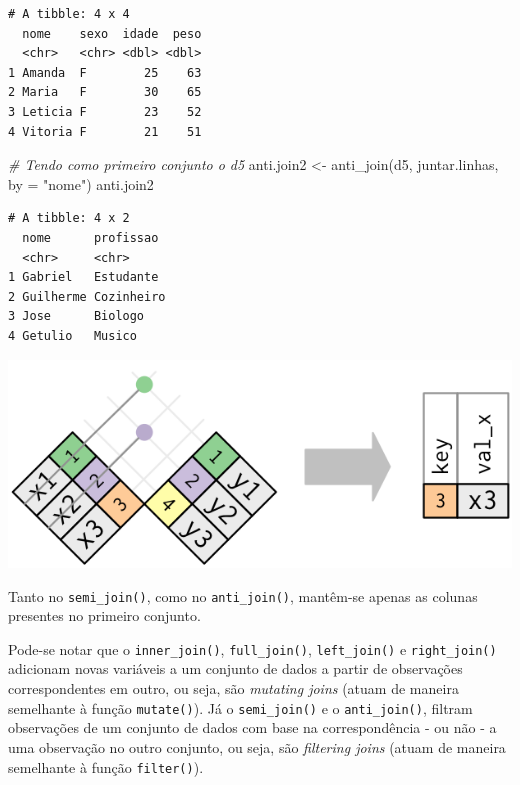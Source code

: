 \documentclass[
  brazilian,
]{book}
\newenvironment{Shaded}{\begin{snugshade}}{\end{snugshade}}
\newcommand{\AttributeTok}[1]{\textcolor[rgb]{0.77,0.63,0.00}{#1}}
\newcommand{\CommentTok}[1]{\textcolor[rgb]{0.56,0.35,0.01}{\textit{#1}}}
\newcommand{\FunctionTok}[1]{\textcolor[rgb]{0.00,0.00,0.00}{#1}}
\newcommand{\NormalTok}[1]{#1}
\newcommand{\OtherTok}[1]{\textcolor[rgb]{0.56,0.35,0.01}{#1}}
\newcommand{\StringTok}[1]{\textcolor[rgb]{0.31,0.60,0.02}{#1}}
\let\origfigure\figure
\let\endorigfigure\endfigure
\renewenvironment{figure}[1][2] {
    \expandafter\origfigure\expandafter[H]
} {
    \endorigfigure
}
\begin{document}
\begin{verbatim}
# A tibble: 4 x 4
  nome    sexo  idade  peso
  <chr>   <chr> <dbl> <dbl>
1 Amanda  F        25    63
2 Maria   F        30    65
3 Leticia F        23    52
4 Vitoria F        21    51
\end{verbatim}

\begin{Shaded}
\begin{Highlighting}[]
\CommentTok{\# Tendo como primeiro conjunto o \textasciigrave{}d5\textasciigrave{}}
\NormalTok{anti.join2 }\OtherTok{\textless{}{-}} \FunctionTok{anti\_join}\NormalTok{(d5, juntar.linhas, }\AttributeTok{by =} \StringTok{"nome"}\NormalTok{)}
\NormalTok{anti.join2}
\end{Highlighting}
\end{Shaded}

\begin{verbatim}
# A tibble: 4 x 2
  nome      profissao 
  <chr>     <chr>     
1 Gabriel   Estudante 
2 Guilherme Cozinheiro
3 Jose      Biologo   
4 Getulio   Musico    
\end{verbatim}

\begin{figure}

{\centering \includegraphics[width=0.5\linewidth]{imagens/join-anti} 

}

\caption{Esquematização da função $anti_join$. Fonte: R for Data Science, 2017.}\label{fig:unnamed-chunk-181}
\end{figure}

Tanto no \texttt{semi\_join()}, como no \texttt{anti\_join()}, mantêm-se apenas as colunas presentes no primeiro conjunto.

Pode-se notar que o \texttt{inner\_join()}, \texttt{full\_join()}, \texttt{left\_join()} e \texttt{right\_join()} adicionam novas variáveis a um conjunto de dados a partir de observações correspondentes em outro, ou seja, são \emph{mutating joins} (atuam de maneira semelhante à função \texttt{mutate()}). Já o \texttt{semi\_join()} e o \texttt{anti\_join()}, filtram observações de um conjunto de dados com base na correspondência - ou não - a uma observação no outro conjunto, ou seja, são \emph{filtering joins} (atuam de maneira semelhante à função \texttt{filter()}).
\end{document}
